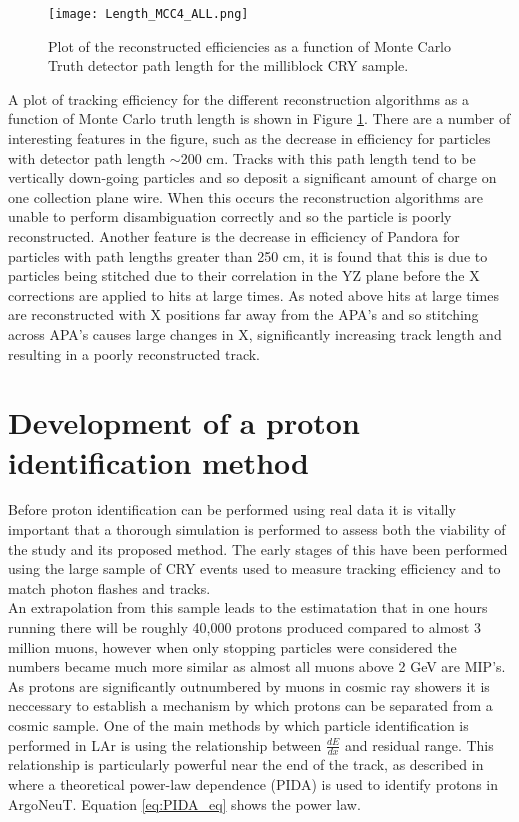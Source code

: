 \documentclass[11pt]{report} %
\begin{document}
{\begin{figure}[h]
  \centering
  \texttt{[image: Length\_MCC4\_ALL.png]}
  \caption{Plot of the reconstructed efficiencies as a function of Monte Carlo Truth detector path length for the milliblock CRY sample.}
  \label{fig:TrackEff_Length_All}
\end{figure}

A plot of tracking efficiency for the different reconstruction algorithms as a function of Monte Carlo truth length is shown in Figure \ref{fig:TrackEff_Length_All}. There are a number of interesting features in the figure, such as the decrease in efficiency for particles with detector path length $\sim$200 cm. Tracks with this path length tend to be vertically down-going particles and so deposit a significant amount of charge on one collection plane wire. When this occurs the reconstruction algorithms are unable to perform disambiguation correctly and so the particle is poorly reconstructed. Another feature is the decrease in efficiency of Pandora for particles with path lengths greater than 250 cm, it is found that this is due to particles being stitched due to their correlation in the YZ plane before the X corrections are applied to hits at large times. As noted above hits at large times are reconstructed with X positions far away from the APA's and so stitching across APA's causes large changes in X, significantly increasing track length and resulting in a poorly reconstructed track. 

\section{Development of a proton identification method}
Before proton identification can be performed using real data it is vitally important that a thorough simulation is performed to assess both the viability of the study and its proposed method. The early stages of this have been performed using the large sample of CRY events used to measure tracking efficiency and to match photon flashes and tracks. \\

An extrapolation from this sample leads to the estimatation that in one hours running there will be roughly 40,000 protons produced compared to almost 3 million muons, however when only stopping particles were considered the numbers became much more similar as almost all muons above 2 GeV are MIP's. As protons are significantly outnumbered by muons in cosmic ray showers it is neccessary to establish a mechanism by which protons can be separated from a cosmic sample. One of the main methods by which particle identification is performed in LAr is using the relationship between $\frac{dE}{dx}$ and residual range. This relationship is particularly powerful near the end of the track, as described in \cite{PIDA} where a theoretical power-law dependence (PIDA) is used to identify protons in ArgoNeuT. Equation \ref{eq:PIDA_eq} shows the power law.

}
\end{document}
